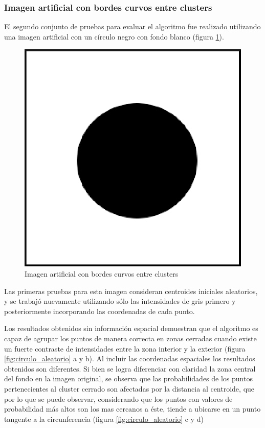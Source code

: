 \subsubsection{Imagen artificial con bordes curvos entre clusters}
El segundo conjunto de pruebas para evaluar el algoritmo fue realizado utilizando una imagen artificial con un círculo negro con fondo blanco  (figura \ref{fig:circulo}).

\begin{figure}[h]
\centering
\includegraphics[scale=0.3]{images/circulo_250x250.eps}
\caption{Imagen artificial con bordes curvos entre clusters}
\label{fig:circulo}
\end{figure}

Las primeras pruebas para esta imagen consideran centroides iniciales aleatorios, y se trabajó nuevamente utilizando sólo las intensidades de gris primero y posteriormente incorporando las coordenadas de cada punto.

Los resultados obtenidos sin información espacial demuestran que el algoritmo es capaz de agrupar los puntos de manera correcta en zonas cerradas cuando existe un fuerte contraste de intensidades entre la zona interior y la exterior (figura \ref{fig:circulo_aleatorio} a y b). Al incluir las coordenadas espaciales los resultados obtenidos son diferentes. Si bien se logra diferenciar con claridad la zona central del fondo en la imagen original, se observa que las probabilidades de los puntos pertenecientes al cluster cerrado son afectadas por la distancia al centroide, que por lo que se puede observar, considerando que los puntos con valores de probabilidad más altos son los mas cercanos a éste, tiende a ubicarse en un punto tangente a la circunferencia (figura \ref{fig:circulo_aleatorio} c y d)

